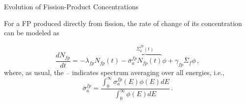 \documentclass[aspectratio=1610]{beamer}
\begin{document}
\begin{frame}[fragile]{Evolution of Fission-Product Concentrations}
 
For a FP produced directly from fission, the rate of change of 
its concentration can be modeled as

\begin{equation*}
 \tag{FNRP 10.7}
 \frac{dN_{fp}}{dt} = -\lambda_{fp} N_{fp}(t) - \overbrace{\bar{\sigma}^{fp}_a N_{fp}(t)}^{\bar{\Sigma}_{a}^{fp} (t)} \phi 
 + \gamma_{fp} \bar{\Sigma}_f \phi \, ,
\end{equation*}
where, as usual, the $\,\bar{}\,$ indicates spectrum averaging over all energies, i.e.,
\begin{equation*}
 \bar{\sigma}_{a}^{fp} = \frac{ \int^{\infty}_{0} \sigma_a^{fp}(E) \phi(E) dE}
 { \int^{\infty}_{0}\phi(E) dE} \, .
\end{equation*}


\end{frame}
\end{document}
